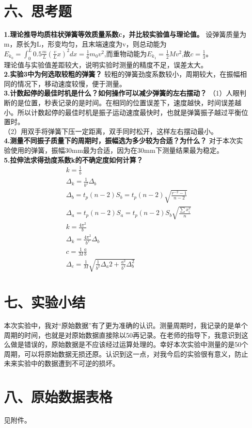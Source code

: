 \documentclass[UTF8]{ctexart}
\begin{document}
\section*{六、思考题}
\textbf{1.理论推导均质柱状弹簧等效质量系数c，并比较实验值与理论值。}
\newline
设弹簧质量为m，原长为L，形变均匀，且末端速度为v，则总动能为$E_{k_0}=\int_0^L 0.5\frac{m}{L}(\frac{v}{L}x)^2dx=\frac{1}{6}m_0v^2$,而重物动能为$E_{k_1}=\frac{1}{2}Mv^2$,故$c=\frac{1}{3}$。\\
理论值与实验值差距较大，说明实验时测量的精度不足，误差太大。\\
\textbf{2.实验3中为何选取较粗的弹簧？}
\newline
较粗的弹簧劲度系数较小，周期较大，在振幅相同的情况下，移动速度较慢，便于测量。\\
\textbf{3.计数起停的最佳时机是什么？如何操作可以减少弹簧的左右摆动？}
\newline
（1）人眼判断的是位置，秒表记录的是时间。在相同的位置误差下，速度越快，时间误差越小。所以计数起停的最佳时机是振子运动速度最快时，也就是弹簧振子越过平衡位置时。\\
（2）用双手将弹簧下压一定距离，双手同时松开，这样左右摆动最小。\\
\textbf{4.测量不同振子质量下的周期时，振幅选为多少较为合适？为什么？}
\newline
对于本次实验使用的弹簧，振幅30mm最为合适，因为在30mm下测量结果最为稳定。\\
\textbf{5.拉伸法求得劲度系数k的不确定度如何计算？}
\begin{equation*}
\begin{aligned}
&k=\frac{1}{b}\\
&\Delta_k=\frac{1}{b^2}\Delta_b\\
&\Delta_b=t_p(n-2)S_b=t_p(n-2)\sqrt{\frac{r^{-2}-1}{n-2}}\\
&\Delta_a=t_p(n-2)S_a=t_p(n-2)S_b\sqrt{\frac{\sum{x_i^2}}{n}}\\
&k=\frac{4\pi^2}{b}\\
&\Delta_k=\frac{4\pi^2}{b^2}\Delta_b\\
&c=\frac{1}{M}\frac{a}{b}\\
&\Delta_c=\frac{1}{M}\sqrt{\frac{1}{b^2}\Delta_a{2}+\frac{a^2}{b^4}\Delta_b^2}
\end{aligned}
\end{equation*}
\section*{七、实验小结}
本次实验中，我对“原始数据”有了更为准确的认识。测量周期时，我记录的是单个周期的时间，也就是对原始数据直接除以50再记录。在老师的指导下，我意识到这么做是错误的，原始数据是不应该经过运算处理的。幸好本次实验中测量的是50个周期，可以将原始数据无损还原。认识到这一点，对我今后的实验很有意义，防止未来实验中的数据遭到不可逆的损坏。
\section*{八、原始数据表格}
见附件。
\end{document}
